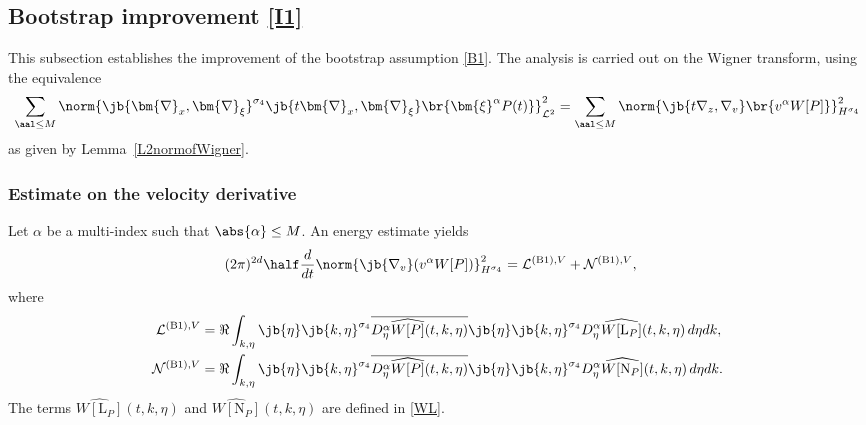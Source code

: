 \subsection{Bootstrap improvement \eqref{I1}}\label{sectionb1}
This subsection establishes the improvement of the bootstrap assumption \eqref{B1}. The analysis is carried out on the Wigner transform, using the equivalence
\begin{align*}
\sum_{\aal\leq M}\norm{\jb{\bm{\nabla}_x,\bm{\nabla}_\xi}^{\sigma_4}\jb{t\bm{\nabla}_x,\bm{\nabla}_\xi}\br{\bm{\xi}^\alpha P(t)}}_{\mathcal L^2}^2=\sum_{\aal\leq M}\norm{\jb{t\nabla_z,\nabla_v}\br{v^\alpha W[P]}}_{H^{\sigma_4}}^2
\end{align*}as given by Lemma~\ref{L2normofWigner}.

\subsubsection{Estimate on the velocity derivative}\label{tricksection}
Let $\alpha$ be a multi-index such that \(\abs{\alpha} \leq M\). An energy estimate yields
\begin{align*}
(2\pi)^{2d}\half\frac{d}{dt}\norm{\jb{\nabla_v}(v^\alpha W[P])}_{H^{\sigma_4}}^2&=\mathcal{L}^{\mathrm{(B1)},V} + \mathcal{N}^{\mathrm{(B1)},V},
\end{align*}where
\begin{align*}
\mathcal{L}^{\mathrm{(B1)},V}&=\Re\int_{k,\eta}\jb{\eta}\jb{k,\eta}^{\sigma_4} \overline{D_\eta^\alpha \widehat{W[P]}(t,k,\eta)}\jb{\eta}\jb{k,\eta}^{\sigma_4} D_\eta^\alpha\widehat{W[{\mathrm{L}_P}]}(t,k,\eta)\,d\eta dk,\\
\mathcal{N}^{\mathrm{(B1)},V} &=\Re \int_{k,\eta}\jb{\eta}\jb{k,\eta}^{\sigma_4} \overline{D_\eta^\alpha \widehat{W[P]}(t,k,\eta)}\jb{\eta}\jb{k,\eta}^{\sigma_4} D_\eta^\alpha\widehat{W[{\mathrm{N}_P}]}(t,k,\eta)\,d\eta dk.
\end{align*}The terms $\widehat{W[{\mathrm{L}_P}]}(t,k,\eta)$ and $\widehat{W[{\mathrm{N}_P}]}(t,k,\eta)$ are defined in \eqref{WL}.

